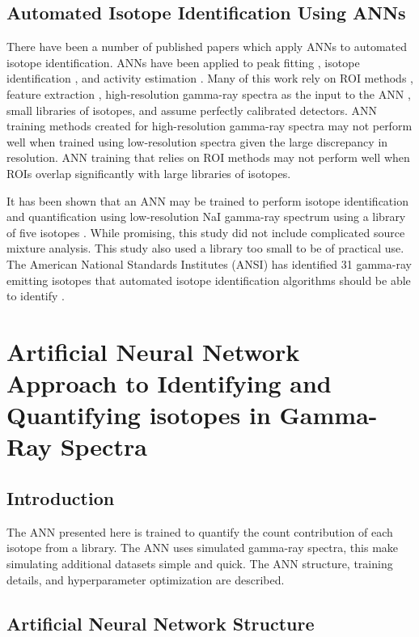 \documentclass[tocnosub,noragright,centerchapter,12pt,fullpage]{uiucecethesis09}
\begin{document}
\section{Automated Isotope Identification Using ANNs}

There have been a number of published papers which apply ANNs to automated isotope identification. ANNs have been applied to peak fitting \cite{Abdel-Aal2002}, isotope identification \cite{Abdel-Aal1996, Medhat2012}, and activity estimation \cite{Abdel-Aal1996, Vigneron1996}. Many of this work rely on ROI methods \cite{Pilato1999}, feature extraction \cite{Chen2009}, high-resolution gamma-ray spectra as the input to the ANN \cite{Yoshida2002}, small libraries of isotopes, and assume perfectly calibrated detectors. ANN training methods created for high-resolution gamma-ray spectra may not perform well when trained using low-resolution spectra given the large discrepancy in resolution. ANN training that relies on ROI methods may not perform well when ROIs overlap significantly with large libraries of isotopes.

It has been shown that an ANN may be trained to perform isotope identification and quantification using low-resolution NaI gamma-ray spectrum using a library of five isotopes \cite{Olmos1991}. While promising, this study did not include complicated source mixture analysis. This study also used a library too small to be of practical use. The American National Standards Institutes (ANSI) has identified 31 gamma-ray emitting isotopes that automated isotope identification algorithms should be able to identify \cite{ANSI}.


\chapter{Artificial Neural Network Approach to Identifying and Quantifying isotopes in Gamma-Ray Spectra}


\section{Introduction}

The ANN presented here is trained to quantify the count contribution of each isotope from a library. The ANN uses simulated gamma-ray spectra, this make simulating additional datasets simple and quick. The ANN structure, training details, and hyperparameter optimization are described. 


\section{Artificial Neural Network Structure}
\end{document}
